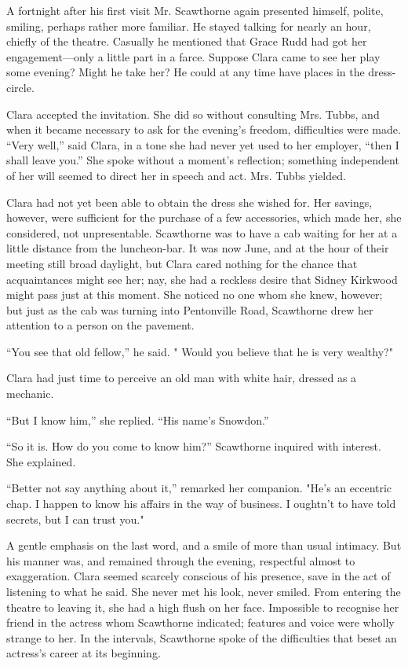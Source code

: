 {\protect\hypertarget{210}{}{}}A fortnight after his first visit Mr.
Scawthorne again presented himself, polite, smiling, perhaps rather more
familiar. He stayed talking for nearly an hour, chiefly of the theatre.
Casually he mentioned that Grace Rudd had got her engagement---only a
little part in a farce. Suppose Clara came to see her play some evening?
Might he take her? He could at any time have places in the dress-circle.

Clara accepted the invitation. She did so without consulting Mrs. Tubbs,
and when it became necessary to ask for the evening's freedom,
difficulties were made. ``Very well,'' said Clara, in a tone she had
never yet used to her employer, ``then I shall leave you.'' She spoke
without a moment's reflection; something independent of her will seemed
to direct her in speech and act. Mrs. Tubbs yielded.

Clara had not yet been able to obtain the dress she wished for. Her
savings, however, were sufficient for the purchase of a few accessories,
which made her, she considered, not
{\protect\hypertarget{211}{}{}}unpresentable. Scawthorne was to have a
cab waiting for her at a little distance from the luncheon-bar. It was
now June, and at the hour of their meeting still broad daylight, but
Clara cared nothing for the chance that acquaintances might see her;
nay, she had a reckless desire that Sidney Kirkwood might pass just at
this moment. She noticed no one whom she knew, however; but just as the
cab was turning into Pentonville Road, Scawthorne drew her attention to
a person on the pavement.

``You see that old fellow,'' he said. " Would you believe that he is
very wealthy?"

Clara had just time to perceive an old man with white hair, dressed as a
mechanic.

``But I know him,'' she replied. ``His name's Snowdon.''

``So it is. How do you come to know him?'' Scawthorne inquired with
interest. She explained.

``Better not say anything about it,'' remarked her companion. "He's an
eccentric chap. I happen to know his affairs in the
{\protect\hypertarget{212}{}{}}way of business. I oughtn't to have told
secrets, but I can trust you."

A gentle emphasis on the last word, and a smile of more than usual
intimacy. But his manner was, and remained through the evening,
respectful almost to exaggeration. Clara seemed scarcely conscious of
his presence, save in the act of listening to what he said. She never
met his look, never smiled. From entering the theatre to leaving it, she
had a high flush on her face. Impossible to recognise her friend in the
actress whom Scawthorne indicated; features and voice were wholly
strange to her. In the intervals, Scawthorne spoke of the difficulties
that beset an actress's career at its beginning.

